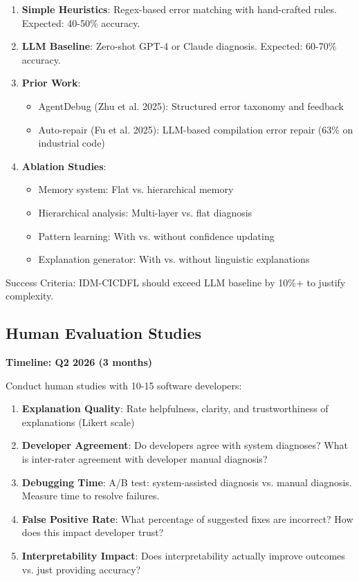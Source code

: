\documentclass[11pt]{article}
\begin{document}
\begin{enumerate}
    \item \textbf{Simple Heuristics}: Regex-based error matching with hand-crafted rules. Expected: 40-50\% accuracy.

    \item \textbf{LLM Baseline}: Zero-shot GPT-4 or Claude diagnosis. Expected: 60-70\% accuracy.

    \item \textbf{Prior Work}:
    \begin{itemize}
        \item AgentDebug (Zhu et al. 2025): Structured error taxonomy and feedback
        \item Auto-repair (Fu et al. 2025): LLM-based compilation error repair (63\% on industrial code)
    \end{itemize}

    \item \textbf{Ablation Studies}:
    \begin{itemize}
        \item Memory system: Flat vs. hierarchical memory
        \item Hierarchical analysis: Multi-layer vs. flat diagnosis
        \item Pattern learning: With vs. without confidence updating
        \item Explanation generator: With vs. without linguistic explanations
    \end{itemize}
\end{enumerate}

Success Criteria: IDM-CICDFL should exceed LLM baseline by 10\%+ to justify complexity.

\subsection{Human Evaluation Studies}

\textbf{Timeline: Q2 2026 (3 months)}

Conduct human studies with 10-15 software developers:

\begin{enumerate}
    \item \textbf{Explanation Quality}: Rate helpfulness, clarity, and trustworthiness of explanations (Likert scale)

    \item \textbf{Developer Agreement}: Do developers agree with system diagnoses? What is inter-rater agreement with developer manual diagnosis?

    \item \textbf{Debugging Time}: A/B test: system-assisted diagnosis vs. manual diagnosis. Measure time to resolve failures.

    \item \textbf{False Positive Rate}: What percentage of suggested fixes are incorrect? How does this impact developer trust?

    \item \textbf{Interpretability Impact}: Does interpretability actually improve outcomes vs. just providing accuracy?
\end{enumerate}
\end{document}
